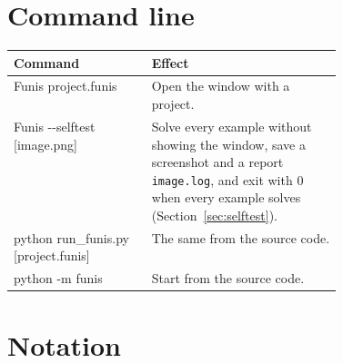 \documentclass[fontsize=10.5pt,paper=a4,parskip=half,headings=normal,numbers=noenddot,
  open=any,bibliography=totoc,captions=tableheading]{scrreprt}
\numberwithin{figure}{chapter}
\numberwithin{table}{chapter}
\newcommand{\file}[1]{\texttt{#1}}
\begin{document}
\section{Command line}\label{app:cli}

\begin{center}\small
\begin{tabularx}{\linewidth}{@{}>{\ttfamily\raggedright\arraybackslash}p{0.42\linewidth}X@{}}
\toprule
\normalfont\bfseries Command & \bfseries Effect\\ \midrule
Funis project.funis & Open the window with a project.\\
Funis -{}-selftest [image.png] & Solve every example without showing the window, save a screenshot and
a report \file{image.log}, and exit with 0 when every example solves (Section~\ref{sec:selftest}).\\
python run\_funis.py [project.funis] & The same from the source code.\\
python -m funis & Start from the source code.\\
\bottomrule
\end{tabularx}
\end{center}

\section{Notation}\label{app:notation}
\end{document}
